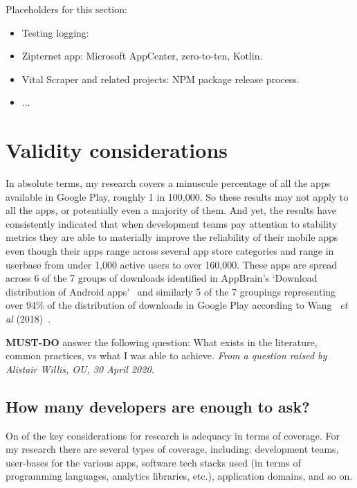 Placeholders for this section:
\begin{itemize}
    \item Testing logging:
    \item Zipternet app: Microsoft AppCenter, zero-to-ten, Kotlin.
    \item Vital Scraper and related projects: NPM package release process.
    \item ...
\end{itemize}



\section{Validity considerations}
In absolute terms, my research covers a minuscule percentage of all the apps available in Google Play, roughly 1 in 100,000. So these results may not apply to all the apps, or potentially even a majority of them. And yet, the results have consistently indicated that when development teams pay attention to stability metrics they are able to materially improve the reliability of their mobile apps even though their apps range across several app store categories and range in userbase from under 1,000 active users to over 160,000. These apps are spread across 6 of the 7 groups of downloads identified in AppBrain's `Download distribution of Android apps'~\cite{appbrain_download_statistics_june_2019} and similarly 5 of the 7 groupings representing over 94\% of the distribution of downloads in Google Play according to Wang ~\emph{et al} (2018)~\cite{wang2018beyond}.

\textbf{MUST-DO} answer the following question: What exists in the literature, common practices, vs what I was able to achieve. \emph{From a question raised by Alistair Willis, OU, 30 April 2020.}

\subsection{How many developers are enough to ask?}
On of the key considerations for research is adequacy in terms of coverage. For my research there are several types of coverage, including: development teams, user-bases for the various apps, software tech stacks used (in terms of programming languages, analytics libraries, etc.), application domains, and so on. 


